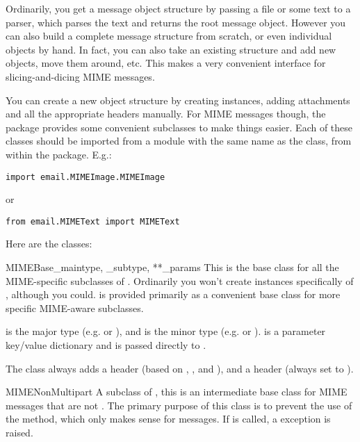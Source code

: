 Ordinarily, you get a message object structure by passing a file or
some text to a parser, which parses the text and returns the root
message object.  However you can also build a complete message
structure from scratch, or even individual  objects by
hand.  In fact, you can also take an existing structure and add new
 objects, move them around, etc.  This makes a very
convenient interface for slicing-and-dicing MIME messages.

You can create a new object structure by creating 
instances, adding attachments and all the appropriate headers manually.
For MIME messages though, the  package provides some
convenient subclasses to make things easier.  Each of these classes
should be imported from a module with the same name as the class, from
within the  package.  E.g.:

\begin{verbatim}
import email.MIMEImage.MIMEImage
\end{verbatim}

or

\begin{verbatim}
from email.MIMEText import MIMEText
\end{verbatim}

Here are the classes:

\begin{classdesc}{MIMEBase}{_maintype, _subtype, **_params}
This is the base class for all the MIME-specific subclasses of
.  Ordinarily you won't create instances specifically
of , although you could.   is provided
primarily as a convenient base class for more specific MIME-aware
subclasses.

 is the  major type
(e.g.  or ), and  is the
 minor type 
(e.g.  or ).   is a parameter
key/value dictionary and is passed directly to
.

The  class always adds a  header
(based on , , and ), and a
 header (always set to ).
\end{classdesc}

\begin{classdesc}{MIMENonMultipart}{}
A subclass of , this is an intermediate base class for
MIME messages that are not .  The primary purpose
of this class is to prevent the use of the  method,
which only makes sense for  messages.  If
 is called, a 
exception is raised.

\end{classdesc}

